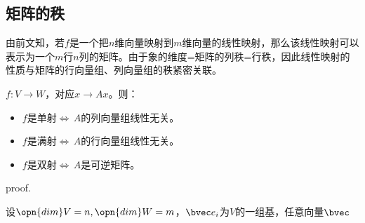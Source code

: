 \subsection{矩阵的秩}
由前文知，若$f$是一个把$n$维向量映射到$m$维向量的线性映射，那么该线性映射可以表示为一个$m$行$n$列的矩阵。由于象的维度=矩阵的列秩=行秩，因此线性映射的性质与矩阵的行向量组、列向量组的秩紧密关联。
\begin{theorem}{}
$f:V\rightarrow W$，对应$x\rightarrow Ax$。则：
\begin{itemize}
\item $f$是单射$\Leftrightarrow\,A$的列向量组线性无关。
\item $f$是满射$\Leftrightarrow\,A$的行向量组线性无关。
\item $f$是双射$\Leftrightarrow\,A$是可逆矩阵。
\end{itemize}
\end{theorem}
proof.

设$\opn{dim}V=n,\opn{dim}W=m$，${\bvec e_i}$为$V$的一组基，任意向量$\bvec $